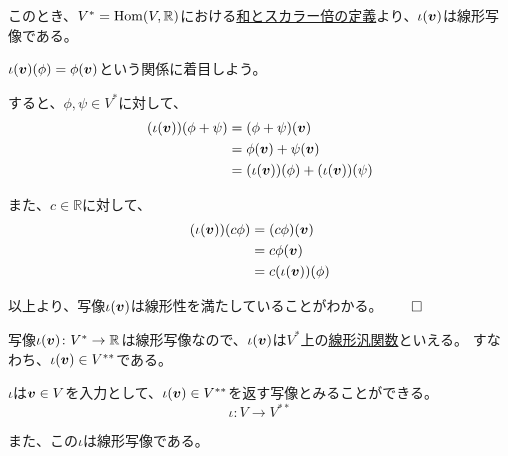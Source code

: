 \documentclass[../../../topic_linear-algebra]{subfiles}
\begin{document}
このとき、$V^* = \operatorname{Hom}(V, \mathbb{R})$における\hyperref[def:linear-map-addition-scalar]{和とスカラー倍の定義}より、$\iota(\vb*{v})$は線形写像である。

\br

\begin{handout}
  $\iota(\vb*{v})(\phi) = \phi(\vb*{v})$という関係に着目しよう。
  
  \br
  
  すると、$\phi, \psi \in V^*$に対して、
  \begin{align*}
    (\iota(\vb*{v}))(\phi + \psi) &= (\phi + \psi)(\vb*{v}) \\
    &= \phi(\vb*{v}) + \psi(\vb*{v}) \\
    &= (\iota(\vb*{v}))(\phi) + (\iota(\vb*{v}))(\psi)
  \end{align*}
  
  また、$c \in \mathbb{R}$に対して、
  \begin{align*}
    (\iota(\vb*{v})) (c\phi) &= (c\phi)(\vb*{v}) \\
    &= c \phi(\vb*{v}) \\
    &= c (\iota(\vb*{v}))(\phi)
  \end{align*}
  
  以上より、写像$\iota(\vb*{v})$は線形性を満たしていることがわかる。$\qed$
\end{handout}

写像$\iota(\vb*{v}) \colon V^* \to \mathbb{R}$は線形写像なので、$\iota(\vb*{v})$は$V^*$上の\hyperref[def:linear-functional]{線形汎関数}といえる。
すなわち、$\iota(\vb*{v}) \in V^{**}$である。

\br

$\iota$は$\vb*{v} \in V$を入力として、$\iota(\vb*{v}) \in V^{**}$を返す写像とみることができる。
\begin{equation*}
  \iota \colon V \to V^{**}
\end{equation*}

また、この$\iota$は線形写像である。

\br
\end{document}
